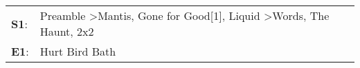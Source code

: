 \begin{supertabular}{p{0.03\textwidth}p{0.92\textwidth}}
 \textbf{S1}:  &  Preamble\textsuperscript{} \textgreater \enspace Mantis\textsuperscript{}, \enspace Gone for Good[1]\textsuperscript{}, \enspace Liquid\textsuperscript{} \textgreater \enspace Words\textsuperscript{}, \enspace The Haunt\textsuperscript{}, \enspace 2x2\textsuperscript{}  \enspace  \\
 \textbf{E1}:  &                                                                                                                                                                                                                                               Hurt Bird Bath\textsuperscript{}  \enspace  \\
\end{supertabular}
